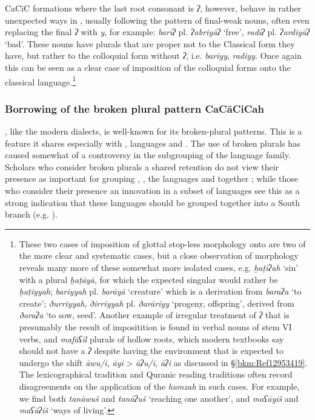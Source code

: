 \documentclass[output=paper]{langsci/langscibook}
\begin{document}
CaCīC formations where the last {root} consonant is \textit{ʔ}, however, behave in rather unexpected ways in , usually following the pattern of final-weak nouns, often even replacing the final \textit{ʔ} with \textit{y}, for example: \textit{barīʔ} pl. \textit{ʔabriyāʔ} ‘free’, \textit{radīʔ} pl. \textit{ʔardiyāʔ} ‘bad’. These nouns have plurals that are proper not to the Classical form they have, but rather to the colloquial form without \textit{ʔ}, i.e. \textit{bariyy}, \textit{radiyy}. Once again this can be seen as a clear case of {imposition} of the colloquial  forms onto the classical language.\footnote{These two cases of {imposition} of glottal stop-less morphology onto  are two of the more clear and systematic cases, but a close observation of  morphology reveals many more of these somewhat more isolated cases, e.g. \textit{ḫaṭīʔah} ‘sin’ with a plural \textit{ḫaṭāyā}, for which the expected singular would rather be \textit{ḫaṭiyyah}; \textit{bariyyah} pl. \textit{barāyā} ‘creature’ which is a {derivation} from \textit{baraʔa} ‘to create’; \textit{ðurriyyah}, \textit{ðirriyyah} pl. \textit{ðarāriyy} ‘progeny, offspring’, derived from \textit{ðaraʔa} ‘to sow, seed’. Another example of irregular treatment of \textit{ʔ} that is presumably the result of impositition is found in verbal nouns of {stem} VI verbs, and \textit{mafāʕil} plurals of hollow {roots}, which modern textbooks say should not have a \textit{ʔ} despite having the environment that is expected to undergo the shift \textit{āwu/i,} \textit{āyi} > \textit{āʔu/i,} \textit{āʔi} as discussed in §\ref{bkm:Ref12953419}. The lexicographical tradition and Quranic reading traditions often record disagreements on the application of the \textit{hamzah} in such cases. For example, we find both \textit{tanāwuš} and \textit{tanāʔuš} ‘reaching one another’, and \textit{maʕāyiš} and \textit{maʕāʔiš} ‘ways of living’.}

\subsubsection{\label{bkm:Ref13224664}Borrowing of the broken plural pattern CaCāCiCah}

, like the modern  dialects, is well-known for its broken-plural patterns. This is a feature it shares especially with  \citep[1050--1051]{Stein2011},  languages \citep[1085]{Simeone-Senelle2011} and  \citep[1132]{Weninger2011OldEth}. The use of broken plurals has caused somewhat of a controversy in the subgrouping of the  language family. Scholars who consider broken plurals a shared retention do not view their presence as important for grouping , , the  languages and  together \citep[159--160]{Huehnergard2005}; while those who consider their presence an innovation in a subset of  languages see this as a strong indication that these languages should be grouped together into a South  branch (e.g. \citealt{Ratcliffe1998}).
\end{document}
